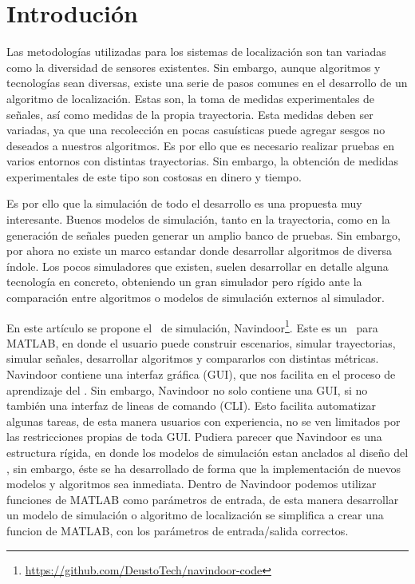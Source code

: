 \section{Introdución}


Las metodologías utilizadas para los sistemas de localización son tan variadas como la diversidad de sensores existentes. Sin embargo, aunque  algoritmos y tecnologías sean diversas, existe una serie de pasos comunes en el desarrollo de un algoritmo de localización. Estas son, la toma de medidas experimentales de señales, así como medidas de la propia trayectoria. Esta medidas deben ser variadas, ya que una recolección en pocas casuísticas puede agregar sesgos no deseados a nuestros algoritmos. Es por ello que es necesario realizar pruebas en varios entornos con distintas trayectorias. Sin embargo, la obtención de medidas experimentales de este tipo son costosas en dinero y tiempo.


Es por ello que la simulación de todo el desarrollo es una propuesta muy interesante. Buenos modelos de simulación, tanto en la trayectoria, como en la generación de señales pueden generar un amplio banco de pruebas. Sin embargo, por ahora no existe un marco estandar donde desarrollar algoritmos de diversa índole. Los pocos simuladores que existen, suelen desarrollar en detalle alguna tecnología en concreto, obteniendo un gran simulador pero rígido ante la  comparación entre algoritmos o modelos de simulación externos al simulador. 


En este artículo se propone el \sw \ de simulación, Navindoor\footnote{\url{https://github.com/DeustoTech/navindoor-code}}. Este es un \sw \ para MATLAB, en donde el usuario puede construir escenarios, simular trayectorias, simular señales, desarrollar algoritmos y compararlos con distintas métricas. Navindoor contiene una interfaz gráfica (GUI), que nos facilita en el proceso de aprendizaje del \sw. Sin embargo, Navindoor no solo contiene una GUI, si no también una interfaz de lineas de comando (CLI). Esto facilita automatizar algunas tareas, de esta manera usuarios con experiencia, no se ven limitados por las restricciones propias de toda GUI. Pudiera parecer que Navindoor es una estructura rígida, en donde los modelos de simulación estan anclados al diseño del \sw, sin embargo, éste se ha desarrollado de forma que la implementación de nuevos modelos y algoritmos sea inmediata. Dentro de Navindoor podemos utilizar funciones de MATLAB como parámetros de entrada, de esta manera desarrollar un modelo de simulación o algoritmo de localización se simplifica a crear una funcion de MATLAB, con los parámetros de entrada/salida correctos.

